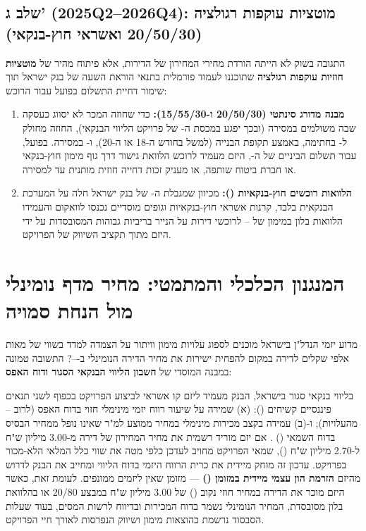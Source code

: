 \subsection{שלב ג' (\num{2025Q2}--\num{2026Q4}): מוטציות עוקפות רגולציה (\num{20/50/30} ואשראי חוץ-בנקאי)}
התגובה בשוק לא הייתה הורדת מחירי המחירון של הדירות, אלא פיתוח מהיר של \textbf{מוטציות חוזיות עוקפות רגולציה} שתוכננו לעמוד פורמלית בתנאי הוראת השעה של בנק ישראל תוך שימור דחיית התשלום בפועל עבור הרוכש:
\begin{enumerate}[label=\textbf{\arabic*.},rightmargin=0.6cm]
  \item \textbf{מבנה מדורג סינתטי (\num{20/50/30} ו-\num{15/55/30}):} כדי שחוזה המכר לא יסווג כעסקה שבה  משולמים במסירה (ובכך יפגע במכסת ה- של פרויקט הליווי הבנקאי), החוזה מחולק ל- בחתימה,  באמצע תקופת הבנייה (למשל בחודש ה-\num{18} או ה-\num{20}), ו- במסירה. בפועל, עבור תשלום הביניים של ה-, היזם מעמיד לרוכש הלוואת גישור דרך גוף מימון חוץ-בנקאי או חברת ביטוח שותפה, או מעניק זכות דחייה חוזית מותנית עד למסירה.
  \item \textbf{הלוואות רוכשים חוץ-בנקאיות ():} מכיוון שמגבלת ה- של בנק ישראל חלה על המערכת הבנקאית בלבד, קרנות אשראי חוץ-בנקאיות וגופים מוסדיים נכנסו לוואקום והעמידו הלוואות בלון במימון של -- לרוכשי דירות על הנייר בריביות גבוהות המסובסדות על ידי היזם מתוך תקציב השיווק של הפרויקט.
\end{enumerate}

\section{המנגנון הכלכלי והמתמטי: מחיר מדף נומינלי מול הנחת  סמויה}
\label{sec:npv_hidden_discount}

מדוע יזמי הנדל"ן בישראל מוכנים לספוג עלויות מימון וויתור על הצמדה למדד בשווי של מאות אלפי שקלים לדירה במקום להפחית ישירות את מחיר הדירה הנומינלי ב---? התשובה טמונה במבנה המוסדי של \textbf{חשבון הליווי הבנקאי הסגור ודוח האפס}:

בליווי בנקאי סגור בישראל, הבנק מעמיד ליזם קו אשראי לביצוע הפרויקט בכפוף לשני תנאים פיננסיים קשיחים (): (א) שמירה על שיעור רווח יזמי מינימלי חזוי בדוח האפס (לרוב -- מהעלויות); ו-(ב) עמידה בקצב מכירות מינימלי במחיר ממוצע למ"ר שאינו נופל ממחיר הבסיס בדוח השמאי () \cite{boi2024annual,salelaw1974}. אם יזם מוריד רשמית את מחיר המחירון של דירה מ-\num{3.00} מיליון ש"ח ל-\num{2.70} מיליון ש"ח (), שמאי הפרויקט מחויב לעדכן כלפי מטה את שווי כלל המלאי הלא-מכור בפרויקט. עדכון זה מוחק מיידית את כרית הרווח היזמי בדוח הליווי ומחייב את הבנק לדרוש מהיזם \textbf{הזרמת הון עצמי מיידית במזומן ()} — מזומן שאין ליזמים ממונפים. לעומת זאת, כאשר היזם מוכר את הדירה במחיר חוזי נקוב () של \num{3.00} מיליון ש"ח במבצע \num{20/80} או בהלוואת בלון מסובסדת, המחיר הנומינלי נשמר בדוח המכירות ובדיווח לרשות המסים, בעוד שעלות הסבסוד נרשמת כהוצאות מימון ושיווק הנפרסות לאורך חיי הפרויקט.

